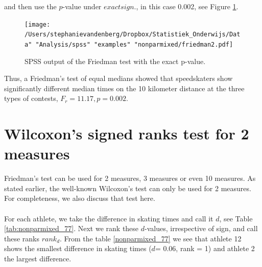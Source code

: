 \documentclass[]{book}\usepackage[]{graphicx}\usepackage[]{color}
\begin{document}
and then use the $p$-value under $exact sign.$, in this case 0.002, see Figure \ref{fig:friedman2}.

\begin{figure}[h]
    \begin{center}
       \texttt{[image: /Users/stephanievandenberg/Dropbox/Statistiek\_Onderwijs/Data" "Analysis/spss" "examples" "nonparmixed/friedman2.pdf]}
    \end{center}
    \caption{SPSS output of the Friedman test with the exact p-value.}
    \label{fig:friedman2}
\end{figure}


Thus, a Friedman's test of equal medians showed that speedskaters show significantly different median times on the 10 kilometer distance at the three types of contests, $F_r=11.17, p=0.002$.



\section{Wilcoxon's signed ranks test for 2 measures}

Friedman's test can be used for 2 measures, 3 measures or even 10 measures. As stated earlier, the well-known Wilcoxon's test can only be used for 2 measures. For completeness, we also discuss that test here.
\\
\\
For each athlete, we take the difference in skating times and call it $d$, see Table \ref{tab:nonparmixed_77}. Next we rank these $d$-values, irrespective of sign, and call these ranks $rank_d$. From the table \ref{nonparmixed_77} we see that athlete 12 shows the smallest difference in skating times ($d$= 0.06, rank = 1) and athlete 2 the largest difference.
\end{document}
